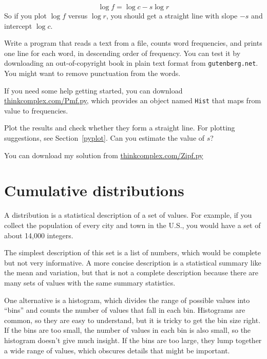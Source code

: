 \documentclass[10pt]{book}
\begin{document}

\[ \log f = \log c - s \log r \]
%
So if you plot $\log f$ versus $\log r$, you should get
a straight line with slope $-s$ and intercept $\log c$.

\begin{ex}

Write a program that reads a text from a file, counts word
frequencies, and prints one line for each word, in descending order of
frequency.  You can test it by downloading an out-of-copyright book in
plain text format from {\tt gutenberg.net}.  You might want to remove
punctuation from the words.

If you need some help getting started, you can download
\url{thinkcomplex.com/Pmf.py}, which provides an
object named {\tt Hist} that maps from value to frequencies.

Plot the results and check whether they form
a straight line.  For plotting suggestions, see Section~\ref{pyplot}.
Can you estimate the value of $s$?

You can download my solution from
\url{thinkcomplex.com/Zipf.py}

\end{ex}



\section{Cumulative distributions}

A distribution is a statistical description of a set of values.
For example, if you collect the population of every city and town
in the U.S., you would have a set of about 14,000 integers.

The simplest description of this set is a list of numbers, which
would be complete but not very informative.  A more concise description
is a statistical summary like the mean and variation, but
that is not a complete description because there are many sets
of values with the same summary statistics.

One alternative is a histogram, which divides the range of
possible values into ``bins'' and counts the number of values that
fall in each bin.  Histograms are common, so they are
easy to understand, but it is tricky to get the bin size right.  If the bins
are too small, the number of values in each bin is also small,
so the histogram doesn't give much insight.  If the bins are
too large, they lump together a wide range of values, which
obscures details that might be important.
\end{document}

